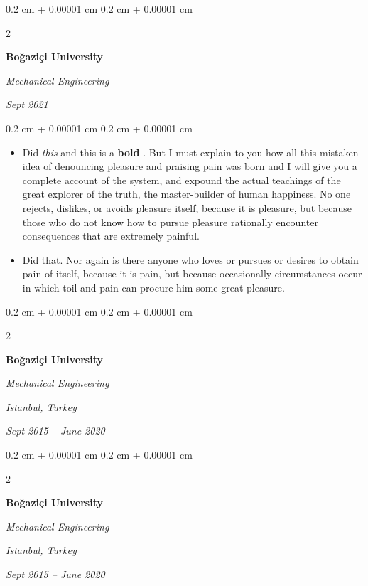 \documentclass[10pt, letterpaper]{article}
\newenvironment{highlights}{
    \begin{itemize}[
        topsep=0.10 cm,
        parsep=0.10 cm,
        partopsep=0pt,
        itemsep=0pt,
        leftmargin=0.4 cm + 10pt
    ]
}{
    \end{itemize}
} %
\newenvironment{onecolentry}{
    \begin{adjustwidth}{
        0.2 cm + 0.00001 cm
    }{
        0.2 cm + 0.00001 cm
    }
}{
    \end{adjustwidth}
} %
\newenvironment{twocolentry}[2][]{
    \onecolentry
    \def\secondColumn{#2}
    \setcolumnwidth{\fill, 4.5 cm}
    \begin{paracol}{2}
}{
    \switchcolumn \raggedleft \secondColumn
    \end{paracol}
    \endonecolentry
} %
\let\hrefWithoutArrow\href
\renewcommand{\href}[2]{\hrefWithoutArrow{#1}{\ifthenelse{\equal{#2}{}}{ }{#2 }\raisebox{.15ex}{\footnotesize \faExternalLink*}}}
\begin{document}
        \vspace{0.2 cm}

        \begin{twocolentry}{
            
            
        \textit{Sept 2021}}
            \textbf{Boğaziçi University}

            \textit{Mechanical Engineering}
        \end{twocolentry}

        \vspace{0.10 cm}
        \begin{onecolentry}
            \begin{highlights}
                \item Did \textit{this} and this is a \textbf{bold} \href{https://example.com}{link}. But I must explain to you how all this mistaken idea of denouncing pleasure and praising pain was born and I will give you a complete account of the system, and expound the actual teachings of the great explorer of the truth, the master-builder of human happiness. No one rejects, dislikes, or avoids pleasure itself, because it is pleasure, but because those who do not know how to pursue pleasure rationally encounter consequences that are extremely painful.
                \item Did that. Nor again is there anyone who loves or pursues or desires to obtain pain of itself, because it is pain, but because occasionally circumstances occur in which toil and pain can procure him some great pleasure.
            \end{highlights}
        \end{onecolentry}


        \vspace{0.2 cm}

        \begin{twocolentry}{
        \textit{Istanbul, Turkey}    
            
        \textit{Sept 2015 – June 2020}}
            \textbf{Boğaziçi University}

            \textit{Mechanical Engineering}
        \end{twocolentry}



        \vspace{0.2 cm}

        \begin{twocolentry}{
        \textit{Istanbul, Turkey}    
            
        \textit{Sept 2015 – June 2020}}
            \textbf{Boğaziçi University}

            \textit{Mechanical Engineering}
        \end{twocolentry}
\end{document}
